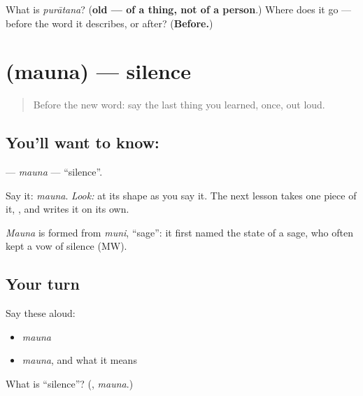 \begin{tcolorbox}[breakable,colback=teal!4,colframe=teal!35!black,title={Before you move on}]
What is \emph{purātana}? (\textbf{old — of a thing, not of a person}.) Where does it go — before the word it describes, or after? (\textbf{Before.})
\end{tcolorbox}
\section[\texorpdfstring{\sk{मौन} (mauna)}{मौन (mauna)}]{ (mauna) — silence}

\label{lesson:SA-C15-mauna}



\begin{quote}
Before the new word: say the last thing you learned, once, out loud.
\end{quote}

\subsection*{You'll want to know: }
\textbf{} — \emph{mauna} — \textquotedblleft{}silence\textquotedblright{}.

Say it: \emph{mauna}. \emph{Look:} at its shape as you say it. The next lesson takes one piece of it, \textbf{}, and writes it on its own.

\begin{cousinweb}
\emph{Mauna} is formed from \emph{muni}, \textquotedblleft{}sage\textquotedblright{}: it first named the state of a sage, who often kept a vow of silence (MW).
\end{cousinweb}

\subsection*{Your turn}
Say these aloud:

\begin{itemize}
\raggedright
  \item \emph{mauna}
  \item \emph{mauna}, and what it means
\end{itemize}

\begin{tcolorbox}[breakable,colback=teal!4,colframe=teal!35!black,title={Before you move on}]
What is \textquotedblleft{}silence\textquotedblright{}? (\textbf{}, \emph{mauna}.)
\end{tcolorbox}
